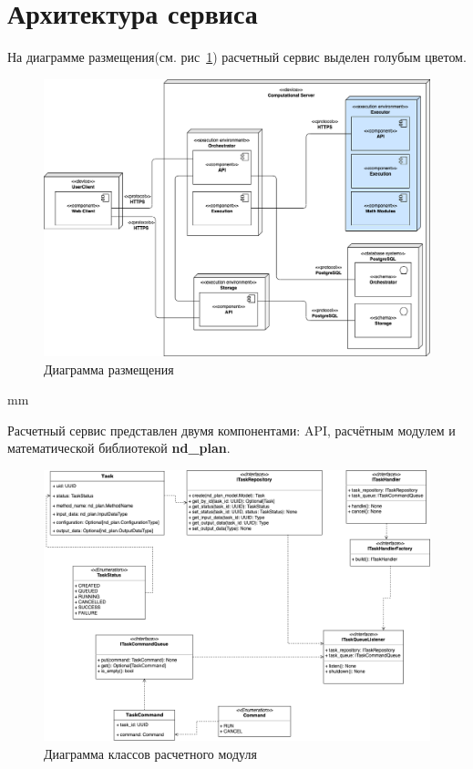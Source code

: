 \section*{\large{Архитектура сервиса}}

На диаграмме размещения(см. рис\ \ref{pic:architecture__deployment-diagram}) расчетный сервис выделен голубым цветом.
\begin{figure}[H]
	\hspace*{-1 cm}\includegraphics[width=\textwidth]{images/architecture/deployment_diagram}
	\caption{Диаграмма размещения}
	\label{pic:architecture__deployment-diagram}
\end{figure}
 mm

Расчетный сервис представлен двумя компонентами: API, расчётным модулем и математической библиотекой \textbf{nd\_plan}.

\begin{figure}[H]
	\hspace*{-2.5 cm}\includegraphics[width=1.2\textwidth]{images/architecture/execution_classes_diagram}
	\caption{Диаграмма классов расчетного модуля}
	\label{pic:architecture__execution-classes-diagram}
\end{figure}

